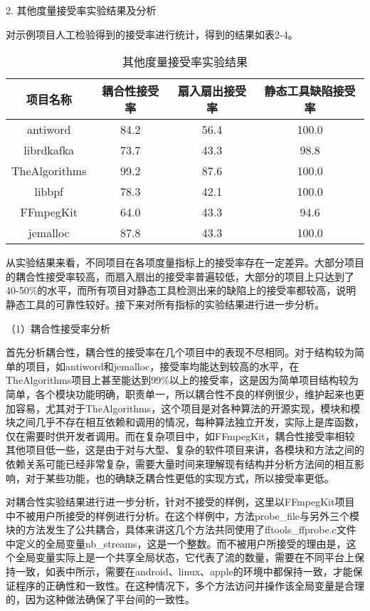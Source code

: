 2. 其他度量接受率实验结果及分析

对示例项目人工检验得到的接受率进行统计，得到的结果如表2-4。

\begin{table}[htbp]
\caption{其他度量接受率实验结果}
\vspace{0.5em}\centering\wuhao
\begin{tabular}{cccc}
\toprule
项目名称 & 耦合性接受率 & 扇入扇出接受率 & 静态工具缺陷接受率 \\
\midrule
antiword & 84.2 & 56.4 & 100.0 \\
librdkafka & 73.7 & 43.3 & 98.8 \\
TheAlgorithms & 99.2 & 87.6 & 100.0 \\
libbpf & 78.3 & 42.1 & 100.0 \\
FFmpegKit & 64.0 & 43.3 & 94.6 \\
jemalloc & 87.8 & 43.3 & 100.0 \\
\bottomrule
\end{tabular}
\end{table}

从实验结果来看，不同项目在各项度量指标上的接受率存在一定差异。大部分项目的耦合性接受率较高，而扇入扇出的接受率普遍较低，大部分的项目上只达到了40-50\%的水平，而所有项目对静态工具检测出来的缺陷上的接受率都较高，说明静态工具的可靠性较好。接下来对所有指标的实验结果进行进一步分析。

（1）耦合性接受率分析

首先分析耦合性，耦合性的接受率在几个项目中的表现不尽相同。对于结构较为简单的项目，如antiword和jemalloc，接受率均能达到较高的水平，在TheAlgorithms项目上甚至能达到99\%以上的接受率，这是因为简单项目结构较为简单，各个模块功能明确，职责单一，所以耦合性不良的样例很少，维护起来也更加容易，尤其对于TheAlgorithms，这个项目是对各种算法的开源实现，模块和模块之间几乎不存在相互依赖和调用的情况，每种算法独立开发，实际上是库函数，仅在需要时供开发者调用。而在复杂项目中，如FFmpegKit，耦合性接受率相较其他项目低一些，这是由于对与大型、复杂的软件项目来讲，各模块和方法之间的依赖关系可能已经非常复杂，需要大量时间来理解现有结构并分析方法间的相互影响，对于某些功能，也的确缺乏耦合性更低的实现方式，所以接受率更低。



对耦合性实验结果进行进一步分析，针对不接受的样例，这里以FFmpegKit项目中不被用户所接受的样例进行分析。在这个样例中，方法probe\_file与另外三个模块的方法发生了公共耦合，具体来讲这几个方法共同使用了fftools\_ffprobe.c文件中定义的全局变量nb\_streams，这是一个整数。而不被用户所接受的理由是，这个全局变量实际上是一个共享全局状态，它代表了流的数量，需要在不同平台上保持一致，如表中所示，需要在android、linux、apple的环境中都保持一致，才能保证程序的正确性和一致性。在这种情况下，多个方法访问并操作该全局变量是合理的，因为这种做法确保了平台间的一致性。


